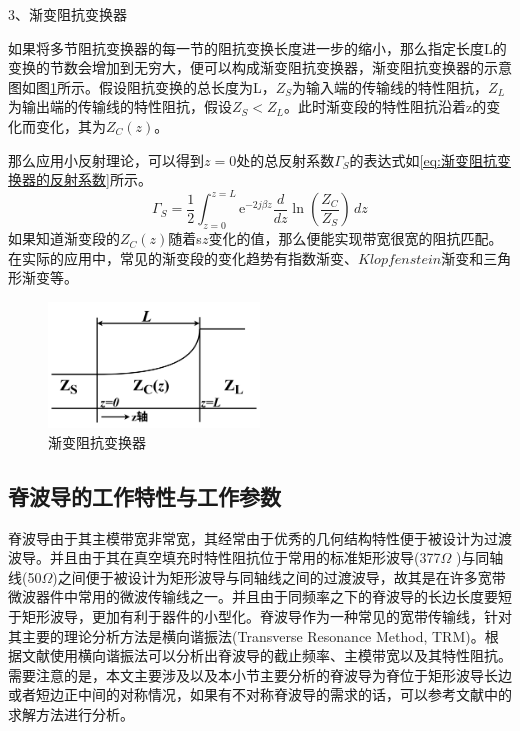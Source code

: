 \documentclass[master]{thesis-uestc}
\begin{document}
3、渐变阻抗变换器

如果将多节阻抗变换器的每一节的阻抗变换长度进一步的缩小，那么指定长度L的变换的节数会增加到无穷大，便可以构成渐变阻抗变换器，渐变阻抗变换器的示意图如图\ref{fig:渐变阻抗变换器}所示。假设阻抗变换的总长度为L，\(Z_S\)为输入端的传输线的特性阻抗，\(Z_L\)为输出端的传输线的特性阻抗，假设\(Z_S < Z_L \)。此时渐变段的特性阻抗沿着z的变化而变化，其为\(Z_C (z)\)。

那么应用小反射理论，可以得到\(z = 0\)处的总反射系数\(\Gamma_S\)的表达式如\ref{eq:渐变阻抗变换器的反射系数}所示。
\begin{equation}\label{eq:渐变阻抗变换器的反射系数}
    \Gamma_S = \frac{1}{2} \int_{z=0}^{z=L} \mathrm{e}^{-2 j \beta z}\frac{d}{d z} \ln \left(\frac{Z_C}{Z_S}\right)  \,dz
\end{equation}
如果知道渐变段的\(Z_C(z)\)随着s\(z\)变化的值，那么便能实现带宽很宽的阻抗匹配。在实际的应用中，常见的渐变段的变化趋势有指数渐变、\(Klopfenstein\)渐变和三角形渐变等。
\begin{figure}[htbp]
    \centering
    \includegraphics[width=0.5\textwidth]{pic/chapter2/渐变阻抗匹配示意图.png}
    \caption{渐变阻抗变换器}
    \label{fig:渐变阻抗变换器}
\end{figure}

\subsection{脊波导的工作特性与工作参数}\label{subsec:DoubleRidgeTheory}
脊波导由于其主模带宽非常宽，其经常由于优秀的几何结构特性便于被设计为过渡波导。并且由于其在真空填充时特性阻抗位于常用的标准矩形波导(377$\Omega$ )与同轴线(50$\Omega$)之间便于被设计为矩形波导与同轴线之间的过渡波导，故其是在许多宽带微波器件中常用的微波传输线之一。并且由于同频率之下的脊波导的长边长度要短于矩形波导，更加有利于器件的小型化。脊波导作为一种常见的宽带传输线，针对其主要的理论分析方法是横向谐振法(Transverse Resonance Method, TRM)。根据文献\cite{helszajn_double_ridge_2000, pingwang_double_ridge_2004,pingyingjiang_double_ridge_2007,hopefer_design_ridge_1955}使用横向谐振法可以分析出脊波导的截止频率、主模带宽以及其特性阻抗。
需要注意的是，本文主要涉及以及本小节主要分析的脊波导为脊位于矩形波导长边或者短边正中间的对称情况，如果有不对称脊波导的需求的话，可以参考文献\cite{ramesh_asymmetri_2001}中的求解方法进行分析。
\end{document}
